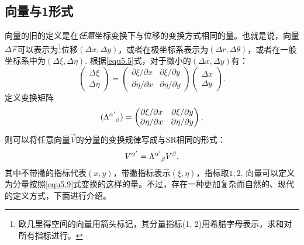 \subsection*{向量与1形式}
向量的旧的定义是在\textit{任意}坐标变换下与位移的变换方式相同的量。也就是说，向量$\Delta \vec{r}$可以表示为\footnote{欧几里得空间的向量用箭头标记，其分量指标(1, 2)用希腊字母表示，求和对所有指标进行。}位移$(\Delta x, \Delta y)$，或者在极坐标系表示为$(\Delta r, \Delta \theta)$，或者在一般坐标系中为$(\Delta \xi, \Delta \eta)$. 根据\eqref{equ5.5}式，对于微小的$(\Delta x, \Delta y)$有：
\begin{equation}
    \begin{pmatrix}
        \Delta \xi \\ \Delta \eta
    \end{pmatrix}
    =
    \begin{pmatrix}
        \partial \xi / \partial x & \partial \xi / \partial y \\
        \partial \eta / \partial x & \partial \eta / \partial y 
    \end{pmatrix}
    \begin{pmatrix}
        \Delta x \\ \Delta y 
    \end{pmatrix}.
\label{equ5.7}
\end{equation}
定义变换矩阵
\begin{equation}
    (\Lambda\indices{^{\alpha'}_{\beta}}) = 
    \begin{pmatrix}
        \partial \xi / \partial x & \partial \xi / \partial y \\
        \partial \eta / \partial x & \partial \eta / \partial y 
    \end{pmatrix},
\label{equ5.8}
\end{equation}
则可以将任意向量$\vec{V}$的分量的变换规律写成与SR相同的形式：
\begin{equation}
    V^{\alpha'} = \Lambda\indices{^{\alpha'}_{\beta}} V^\beta,
\label{equ5.9}
\end{equation}
其中不带撇的指标代表$(x, y)$，带撇指标表示$(\xi, \eta)$，指标取$1, 2$. 向量可以定义为分量按照\eqref{equ5.9}式变换的这样的量。不过，存在一种更加复杂而自然的、现代的定义方式，下面进行介绍。

